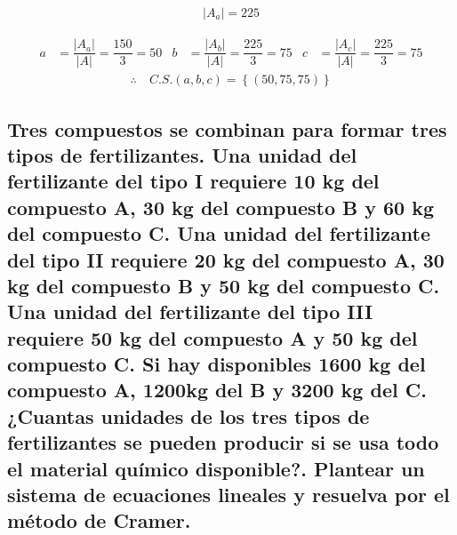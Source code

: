 \documentclass[11pt, a4paper]{article}
\begin{document}
    \begin{center}
      \begin{align*}
        |A_a| = 225
      \end{align*}
    \end{center}
    \begin{align*}
      a &= \dfrac{|A_a|}{|A|} = \dfrac{150}{3} = 50&
      b &= \dfrac{|A_b|}{|A|} = \dfrac{225}{3} = 75&
      c &= \dfrac{|A_c|}{|A|} = \dfrac{225}{3} = 75
    \end{align*}
    \begin{align*}
      \therefore \ &C.S. \left(a,b,c\right) = \left\{\left(50,75,75\right)\right\}
    \end{align*}
\newpage
\subsection{Tres compuestos se combinan para formar tres tipos de fertilizantes. Una unidad del fertilizante del tipo I requiere 10 kg del compuesto A, 30 kg del compuesto B y 60 kg del compuesto C. Una unidad del fertilizante del tipo II requiere 20 kg del compuesto A, 30 kg del compuesto B y 50 kg del compuesto C. Una unidad del fertilizante del tipo III requiere 50 kg del compuesto A y 50 kg del compuesto C. Si hay disponibles 1600 kg del compuesto A, 1200kg del B y 3200 kg del C. ¿Cuantas unidades de los tres tipos de fertilizantes se pueden producir si se usa todo el material químico disponible?. Plantear un sistema de ecuaciones lineales y resuelva por el método de Cramer.}
\end{document}
